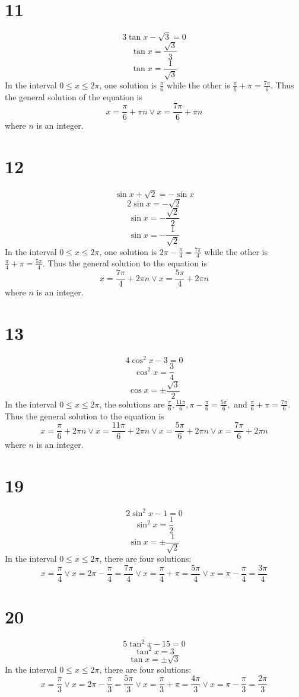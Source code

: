 \documentclass{article}
\theoremstyle{definition}
\newcommand{\?}{\stackrel{?}{=}}
\begin{document}
\section*{11}
\[ 3\tan x-\sqrt{3}=0 \]
\[ \tan x=\frac{\sqrt{3}}{3} \]
\[ \tan x=\frac{1}{\sqrt{3}} \]
In the interval $0\le x\le 2\pi$, one solution is $\frac{\pi}{6}$ while the other is $\frac{\pi}{6}+\pi=\frac{7\pi}{6}$.
Thus the general solution of the equation is
\[ x=\frac{\pi}{6}+\pi n\vee x=\frac{7\pi}{6}+\pi n \] where $n$ is an integer.

\section*{12}
\[ \sin x+\sqrt{2}=-\sin x \]
\[ 2\sin x=-\sqrt{2} \]
\[ \sin x=-\frac{\sqrt{2}}{2} \]
\[ \sin x=-\frac{1}{\sqrt{2}} \]
In the interval $0\le x\le 2\pi$, one solution is $2\pi-\frac{\pi}{4}=\frac{7\pi}{4}$ while the other is $\frac{\pi}{4}+\pi=\frac{5\pi}{4}$.
Thus the general solution to the equation is
\[ x=\frac{7\pi}{4}+2\pi n\vee x=\frac{5\pi}{4}+2\pi n \] where $n$ is an integer.

\section*{13}
\[ 4\cos^2 x-3=0 \]
\[ \cos^2 x=\frac{3}{4} \]
\[ \cos x=\pm\frac{\sqrt{3}}{2} \]
In the interval $0\le x\le 2\pi$, the solutions are $\frac{\pi}{6},\frac{11\pi}{6},\pi-\frac{\pi}{6}=\frac{5\pi}{6},$ and 
$\frac{\pi}{6}+\pi=\frac{7\pi}{6}$. Thus the general solution to the equation is
\[ x=\frac{\pi}{6}+2\pi n\vee x=\frac{11\pi}{6}+2\pi n\vee x=\frac{5\pi}{6}+2\pi n\vee x=\frac{7\pi}{6}+2\pi n \] where $n$ is an integer.

\section*{19}
\[ 2\sin^2 x-1=0 \]
\[ \sin ^2x=\frac{1}{2} \]
\[ \sin x=\pm\frac{1}{\sqrt{2}} \]
In the interval $0\le x\le 2\pi$, there are four solutions:
\[ x=\frac{\pi}{4}\vee x=2\pi-\frac{\pi}{4}=\frac{7\pi}{4}\vee x=\frac{\pi}{4}+\pi=\frac{5\pi}{4}\vee x=\pi-\frac{\pi}{4}=\frac{3\pi}{4} \]

\section*{20}
\[ 5\tan^2 x-15=0 \]
\[ \tan^2 x=3 \]
\[ \tan x=\pm\sqrt{3} \]
In the interval $0\le x\le 2\pi$, there are four solutions:
\[ x=\frac{\pi}{3}\vee x=2\pi-\frac{\pi}{3}=\frac{5\pi}{3}\vee x=\frac{\pi}{3}+\pi=\frac{4\pi}{3}\vee x=\pi-\frac{\pi}{3}=\frac{2\pi}{3} \]
\end{document}
